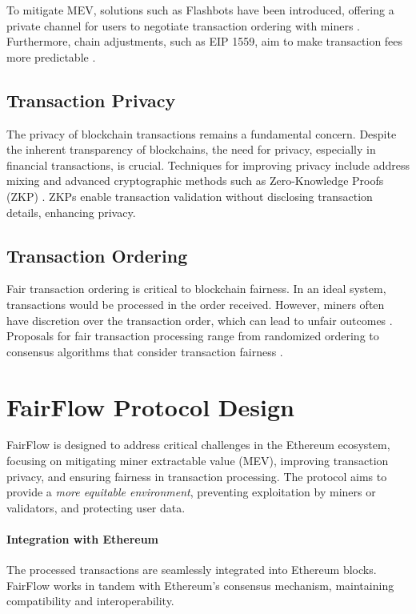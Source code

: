 \documentclass{article}
\begin{document}
To mitigate MEV, solutions such as Flashbots have been introduced, offering a private channel for users to negotiate transaction ordering with miners \citep{flashbots2021mev}. Furthermore, chain adjustments, such as EIP 1559, aim to make transaction fees more predictable \citep{buterin2021rollup}.

\subsection{Transaction Privacy}

The privacy of blockchain transactions remains a fundamental concern. Despite the inherent transparency of blockchains, the need for privacy, especially in financial transactions, is crucial. Techniques for improving privacy include address mixing and advanced cryptographic methods such as Zero-Knowledge Proofs (ZKP) \citep{bensasson2014zerocash}. ZKPs enable transaction validation without disclosing transaction details, enhancing privacy.

\subsection{Transaction Ordering}

Fair transaction ordering is critical to blockchain fairness. In an ideal system, transactions would be processed in the order received. However, miners often have discretion over the transaction order, which can lead to unfair outcomes \citep{bonneau2015bitcoinresearch}. Proposals for fair transaction processing range from randomized ordering to consensus algorithms that consider transaction fairness \citep{kiayias2017ouroboros}.


\section{FairFlow Protocol Design}

FairFlow is designed to address critical challenges in the Ethereum ecosystem, focusing on mitigating miner extractable value (MEV), improving transaction privacy, and ensuring fairness in transaction processing. The protocol aims to provide a \textit{more equitable environment}, preventing exploitation by miners or validators, and protecting user data.

\paragraph{Integration with Ethereum} The processed transactions are seamlessly integrated into Ethereum blocks. FairFlow works in tandem with Ethereum's consensus mechanism, maintaining compatibility and interoperability.
\end{document}
